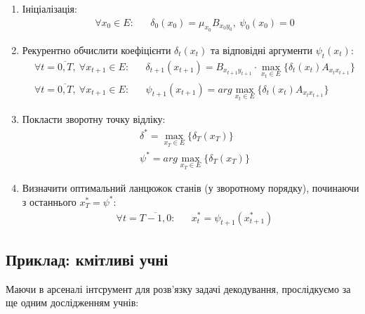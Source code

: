 \begin{enumerate}
    \item Ініціалізація:
    \begin{align*}
        &\forall x_0\in E: && \delta_0(x_0)=\mu_{x_0}B_{x_0y_0}, \ \psi_0(x_0)=0
    \end{align*}    
    \item Рекурентно обчислити коефіцієнти $\delta_t(x_t)$ та відповідні аргументи $\psi_t(x_t):$
    \begin{align*}
        &\forall t=\overline{0,T}, \ \forall x_{t+1} \in E: && \delta_{t+1}(x_{t+1})=B_{x_{t+1}y_{t+1}}\cdot\max_{x_t\in E}\{\delta_t(x_t)A_{x_tx_{t+1}}\} \\
        &\forall t=\overline{0,T}, \ \forall x_{t+1} \in E: && \psi_{t+1}(x_{t+1})=arg\max_{x_t\in E}\{\delta_t(x_t)A_{x_tx_{t+1}}\}
    \end{align*}
    \item Покласти зворотну точку відліку:
    \begin{align*}
        &\delta^*=\max_{x_T\in E}\{\delta_T(x_T)\} \\
        &\psi^*=arg\max_{x_T\in E}\{\delta_T(x_T)\}
    \end{align*}
    \item Визначити оптимальний ланцюжок станів (у зворотному порядку), починаючи з останнього $x_T^*=\psi^*:$
    \begin{align*}
        &\forall t=\overline{T-1,0}: && x_t^*=\psi_{t+1}(x_{t+1}^*)
    \end{align*}
\end{enumerate}

\subsection{Приклад: кмітливі учні}

Маючи в арсеналі інтсрумент для розв'язку задачі декодування, прослідкуємо за ще одним дослідженням учнів:


